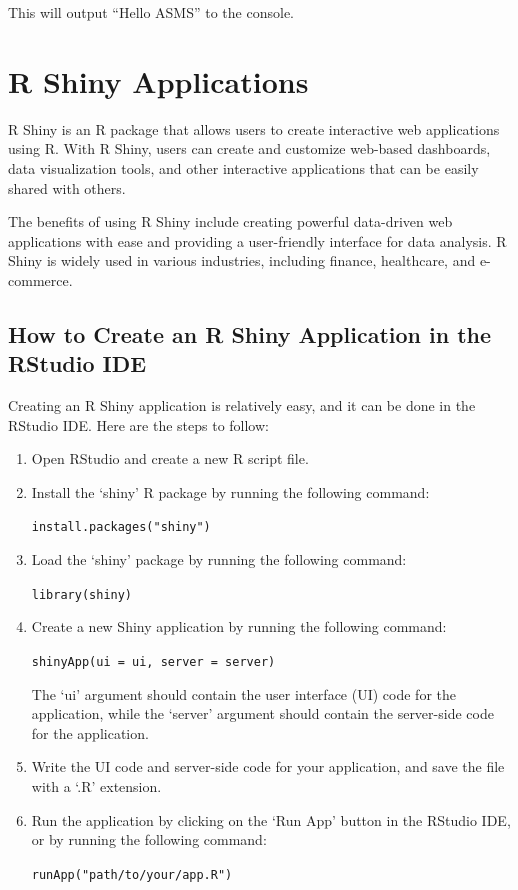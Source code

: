 \documentclass[
]{book}
\begin{document}
This will output ``Hello ASMS'' to the console.

\hypertarget{r-shiny-applications}{%
\section{R Shiny Applications}\label{r-shiny-applications}}

R Shiny is an R package that allows users to create interactive web applications using R. With R Shiny, users can create and customize web-based dashboards, data visualization tools, and other interactive applications that can be easily shared with others.

The benefits of using R Shiny include creating powerful data-driven web applications with ease and providing a user-friendly interface for data analysis. R Shiny is widely used in various industries, including finance, healthcare, and e-commerce.

\hypertarget{how-to-create-an-r-shiny-application-in-the-rstudio-ide}{%
\subsection*{How to Create an R Shiny Application in the RStudio IDE}\label{how-to-create-an-r-shiny-application-in-the-rstudio-ide}}

Creating an R Shiny application is relatively easy, and it can be done in the RStudio IDE. Here are the steps to follow:

\begin{enumerate}
\def\labelenumi{\arabic{enumi}.}
\item
  Open RStudio and create a new R script file.
\item
  Install the `shiny' R package by running the following command:

  \texttt{install.packages("shiny")}
\item
  Load the `shiny' package by running the following command:

  \texttt{library(shiny)}
\item
  Create a new Shiny application by running the following command:

  \texttt{shinyApp(ui\ =\ ui,\ server\ =\ server)}

  The `ui' argument should contain the user interface (UI) code for the application, while the `server' argument should contain the server-side code for the application.
\item
  Write the UI code and server-side code for your application, and save the file with a `.R' extension.
\item
  Run the application by clicking on the `Run App' button in the RStudio IDE, or by running the following command:

  \texttt{runApp("path/to/your/app.R")}
\end{enumerate}
\end{document}
